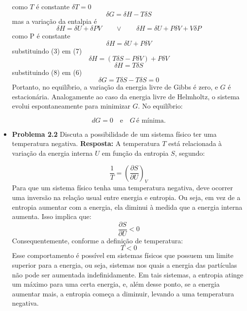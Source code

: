 \documentclass[12pt]{article}
\begin{document}
\begin{itemize}
    como $T$ é constante $\delta T = 0$
    \begin{equation}
        \delta G = \delta H - T \delta S
    \end{equation}
    mas a variação da entalpia é 
    \[
    \delta H = \delta U + \delta PV \quad \quad \vee \quad \quad \delta H = \delta U + P \delta V + V \delta P
    \]
    como P é constante
    \begin{equation}
        \delta H = \delta U + P \delta V
    \end{equation}
    substituindo (3) em (7)
    \[
     \delta H = (T \delta S - P \delta V) + P \delta V
    \]
    \begin{equation}
       \delta H = T \delta S
    \end{equation}
    substituindo (8) em (6)
    \[
    \delta G = T \delta S - T \delta S = 0
    \]
    Portanto, no equilíbrio, a variação da energia livre de Gibbs é zero, e $G$ é estacionária. Analogamente ao caso da energia livre de Helmholtz, o sistema evolui espontaneamente para minimizar $G$. No equilíbrio:
    
    \[
    dG = 0 \quad \text{e} \quad G \, \text{é mínima}.
    \]
     \item \textbf{Problema 2.2} Discuta a possibilidade de um sistema físico ter uma temperatura negativa.
     \textbf{Resposta:} A temperatura  \( T \) está relacionada à variação da energia interna \( U \) em função da entropia \( S \), segundo:

\[
\frac{1}{T} = \left( \frac{\partial S}{\partial U} \right)_V
\]
Para que um sistema físico tenha uma temperatura negativa, deve ocorrer uma inversão na relação usual entre energia e entropia. Ou seja, em vez de a entropia aumentar com a energia, ela diminui à medida que a energia interna aumenta. Isso implica que:
     \[
     \frac{\partial S}{\partial U} < 0
     \]
     Consequentemente, conforme a definição de temperatura:
     \[
     T < 0
     \]
     Esse comportamento é possível em sistemas físicos que possuem um limite superior para a energia, ou seja, sistemas nos quais a energia das partículas não pode ser aumentada indefinidamente. Em tais sistemas, a entropia atinge um máximo para uma certa energia, e, além desse ponto, se a energia aumentar mais, a entropia começa a diminuir, levando a uma temperatura negativa.
     

\end{itemize}
\end{document}
